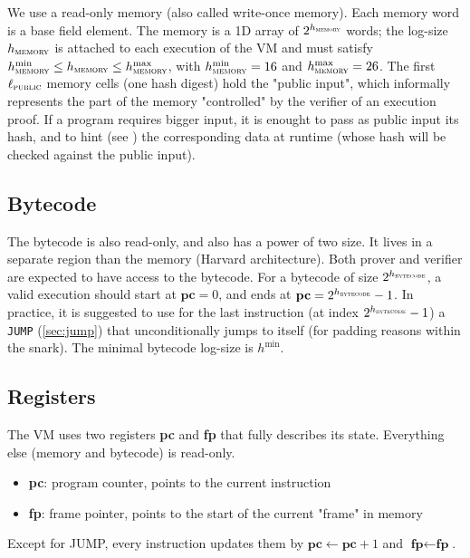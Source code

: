 \documentclass{article}
\theoremstyle{definition}
\begin{document}
We use a read-only memory (also called write-once memory). Each memory word is a base field element. The memory is a 1D array of $2^{h_\textsc{memory}}$ words; the log-size $h_\textsc{memory}$ is attached to each execution of the VM and must satisfy $h_\textsc{memory}^{\min} \leq h_\textsc{memory} \leq h_\textsc{memory}^{\max}$, with $h_\textsc{memory}^{\min} = 16$ and $h_\textsc{memory}^{\max} = 26$. The first $\ell_\textsc{public}$ memory cells (one hash digest) hold the "public input", which informally represents the part of the memory "controlled" by the verifier of an execution proof. If a program requires bigger input, it is enought to pass as public input its hash, and to hint (see ) the corresponding data at runtime (whose hash will be checked against the public input).

\subsection{Bytecode}

The bytecode is also read-only, and also has a power of two size. It lives in a separate region than the memory (Harvard architecture). Both prover and verifier are expected to have access to the bytecode. For a bytecode of size $2^{h_\textsc{bytecode}}$, a valid execution should start at $\textbf{pc} = 0$, and ends at $\textbf{pc} = 2^{h_\textsc{bytecode}} - 1$. In practice, it is suggested to use for the last instruction (at index $2^{h_\textsc{bytecode}} - 1$) a \texttt{JUMP} (\cref{sec:jump}) that unconditionally jumps to itself (for padding reasons within the snark). The minimal bytecode log-size is $h^{\min}$.

\subsection{Registers}

The VM uses two registers \textbf{pc} and \textbf{fp} that fully describes its state. Everything else (memory and bytecode) is read-only.

\begin{itemize}
    \item \textbf{pc}: program counter, points to the current instruction
    \item \textbf{fp}: frame pointer, points to the start of the current "frame" in memory
\end{itemize}

 Except for JUMP, every instruction updates them by $\textbf{pc} \gets \textbf{pc} + 1$ and $\textbf{fp} \gets \textbf{fp}$.
\end{document}

